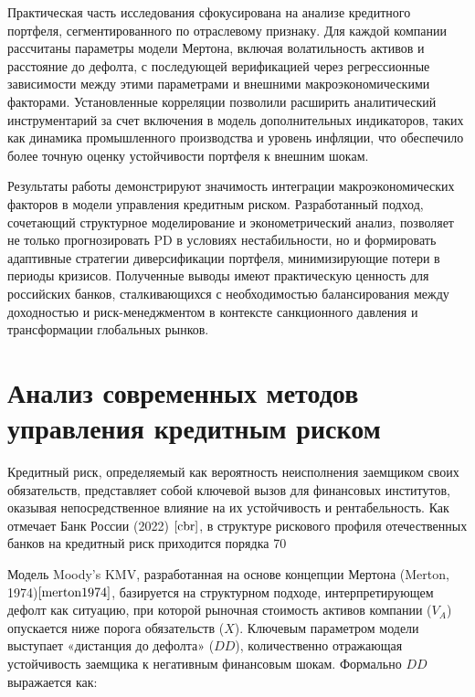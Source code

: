 \documentclass[]{article}
\begin{document}
	Практическая часть исследования сфокусирована на анализе кредитного портфеля, сегментированного по отраслевому признаку. Для каждой компании рассчитаны параметры модели Мертона, включая волатильность активов и расстояние до дефолта, с последующей верификацией через регрессионные зависимости между этими параметрами и внешними макроэкономическими факторами. Установленные корреляции позволили расширить аналитический инструментарий за счет включения в модель дополнительных индикаторов, таких как динамика промышленного производства и уровень инфляции, что обеспечило более точную оценку устойчивости портфеля к внешним шокам.  
	
	Результаты работы демонстрируют значимость интеграции макроэкономических факторов в модели управления кредитным риском. Разработанный подход, сочетающий структурное моделирование и эконометрический анализ, позволяет не только прогнозировать PD в условиях нестабильности, но и формировать адаптивные стратегии диверсификации портфеля, минимизирующие потери в периоды кризисов. Полученные выводы имеют практическую ценность для российских банков, сталкивающихся с необходимостью балансирования между доходностью и риск-менеджментом в контексте санкционного давления и трансформации глобальных рынков.
	
	
	
	\section{Анализ современных методов управления кредитным риском}
	
	Кредитный риск, определяемый как вероятность неисполнения заемщиком своих обязательств, представляет собой ключевой вызов для финансовых институтов, оказывая непосредственное влияние на их устойчивость и рентабельность. Как отмечает Банк России (2022) $\cite{cbr}$, в структуре рискового профиля отечественных банков на кредитный риск приходится порядка 70%
	
	Модель Moody’s KMV, разработанная на основе концепции Мертона (Merton, 1974)$\cite{merton1974}$, базируется на структурном подходе, интерпретирующем дефолт как ситуацию, при которой рыночная стоимость активов компании (\(V_A\)) опускается ниже порога обязательств (\(X\)). Ключевым параметром модели выступает «дистанция до дефолта» (\(DD\)), количественно отражающая устойчивость заемщика к негативным финансовым шокам. Формально \(DD\) выражается как:  
	
\end{document}
